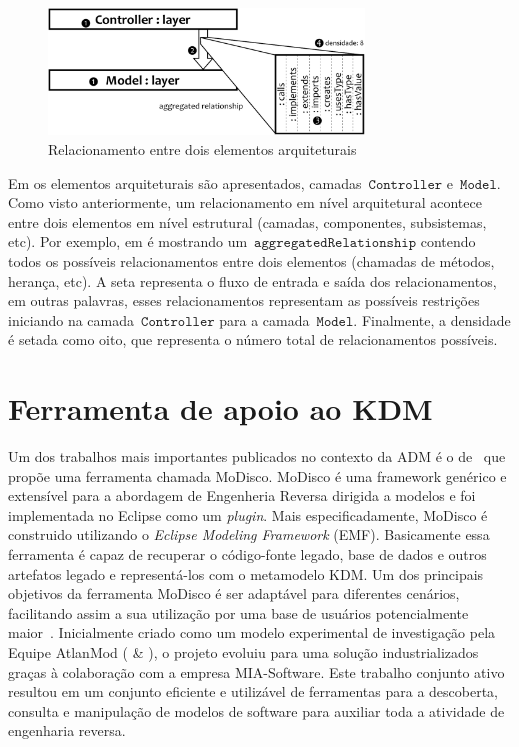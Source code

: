 \begin{figure}[!ht]
	\centering
	\includegraphics[width=3.3in]{images/relationshipExample1.pdf}
	\caption{Relacionamento entre dois elementos arquiteturais}
	\label{fig:relationship_example_1}
\end{figure}


Em  os elementos arquiteturais são apresentados, camadas~$\mathtt{Controller}$ e~$\mathtt{Model}$. Como visto anteriormente, um relacionamento em nível arquitetural acontece entre dois elementos em nível estrutural (camadas, componentes, subsistemas, etc). Por exemplo, em  é mostrando um~$\mathtt{aggregatedRelationship}$ contendo todos os possíveis relacionamentos  entre dois elementos (chamadas de métodos, herança, etc). A seta  representa o fluxo de entrada e saída dos relacionamentos, em outras palavras, esses relacionamentos representam as possíveis restrições iniciando na camada~$\mathtt{Controller}$  para a camada~$\mathtt{Model}$. Finalmente, a densidade  é setada como oito, que representa o número total de relacionamentos possíveis.


\section{Ferramenta de apoio ao KDM}

Um dos trabalhos mais importantes publicados no contexto da ADM é o de~ que propõe uma ferramenta chamada MoDisco. MoDisco é uma framework genérico e extensível para a abordagem de Engenheria Reversa dirigida a modelos e foi implementada no  Eclipse como um \textit{plugin}. Mais especificadamente, MoDisco é construido utilizando o \textit{Eclipse Modeling Framework} (EMF). Basicamente essa ferramenta é capaz de recuperar o código-fonte legado, base de dados e outros artefatos legado e representá-los com o metamodelo KDM. Um dos principais objetivos da ferramenta MoDisco é ser adaptável para diferentes cenários, facilitando assim a sua utilização por uma base de usuários potencialmente maior~\cite{Bruneliere_2014}. Inicialmente criado como um modelo experimental de investigação pela Equipe AtlanMod ( \& ), o projeto evoluiu para uma solução industrializados graças à colaboração com a empresa MIA-Software. Este trabalho conjunto ativo resultou em um conjunto eficiente e utilizável de ferramentas para a descoberta, consulta e manipulação de modelos de software para auxiliar toda a atividade de engenharia reversa.

